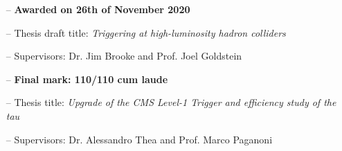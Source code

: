 \documentclass[10pt,a4paper]{altacv}
\begin{document}

%

\begin{fullwidth}
\makecvheader
%
\end{fullwidth}





\begin{itemize}
    \setlength{\itemindent}{0.5em}
    \item[--]   \textbf{Awarded on 26th of November 2020}
    \item[--]   Thesis draft title: \textit{Triggering at high-luminosity hadron colliders}
    \item[--]   Supervisors: Dr. Jim Brooke and Prof. Joel Goldstein
\end{itemize}

\medskip


\begin{itemize}
    \setlength{\itemindent}{0.5em}
    \item[--]   \textbf{Final mark: 110/110 cum laude}
    \item[--]   Thesis title: \textit{Upgrade of the CMS Level-1 Trigger and efficiency study of the tau}
    \item[--]   Supervisors: Dr. Alessandro Thea and Prof. Marco Paganoni
\end{itemize}

\medskip

\end{document}
